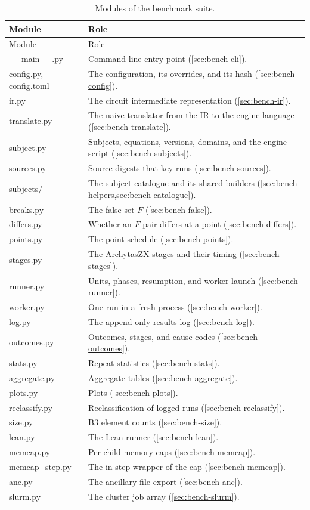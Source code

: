 \begin{xltabular}{\textwidth}{@{}>{\ttfamily}l X@{}}
\caption{Modules of the benchmark suite.}\label{tab:bench-modules}\\
\toprule
\normalfont Module & Role\\
\midrule\endfirsthead
\toprule
\normalfont Module & Role\\
\midrule\endhead
\bottomrule\endfoot
\_\_main\_\_.py & Command-line entry point (\cref{sec:bench-cli}).\\
config.py, config.toml & The configuration, its overrides, and its hash (\cref{sec:bench-config}).\\
ir.py & The circuit intermediate representation (\cref{sec:bench-ir}).\\
translate.py & The naive translator from the IR to the engine language (\cref{sec:bench-translate}).\\
subject.py & Subjects, equations, versions, domains, and the engine script (\cref{sec:bench-subjects}).\\
sources.py & Source digests that key runs (\cref{sec:bench-sources}).\\
subjects/ & The subject catalogue and its shared builders (\cref{sec:bench-helpers,sec:bench-catalogue}).\\
breaks.py & The false set $F$ (\cref{sec:bench-false}).\\
differs.py & Whether an $F$ pair differs at a point (\cref{sec:bench-differs}).\\
points.py & The point schedule (\cref{sec:bench-points}).\\
stages.py & The ArchytasZX stages and their timing (\cref{sec:bench-stages}).\\
runner.py & Units, phases, resumption, and worker launch (\cref{sec:bench-runner}).\\
worker.py & One run in a fresh process (\cref{sec:bench-worker}).\\
log.py & The append-only results log (\cref{sec:bench-log}).\\
outcomes.py & Outcomes, stages, and cause codes (\cref{sec:bench-outcomes}).\\
stats.py & Repeat statistics (\cref{sec:bench-stats}).\\
aggregate.py & Aggregate tables (\cref{sec:bench-aggregate}).\\
plots.py & Plots (\cref{sec:bench-plots}).\\
reclassify.py & Reclassification of logged runs (\cref{sec:bench-reclassify}).\\
size.py & B3 element counts (\cref{sec:bench-size}).\\
lean.py & The Lean runner (\cref{sec:bench-lean}).\\
memcap.py & Per-child memory caps (\cref{sec:bench-memcap}).\\
memcap\_step.py & The in-step wrapper of the  cap (\cref{sec:bench-memcap}).\\
anc.py & The ancillary-file export (\cref{sec:bench-anc}).\\
slurm.py & The cluster job array (\cref{sec:bench-slurm}).\\
\end{xltabular}

